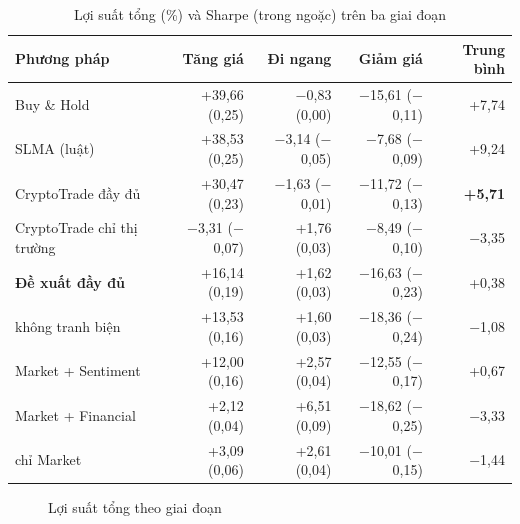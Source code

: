 \begin{table}[H]
\centering
\caption{Lợi suất tổng (\%) và Sharpe (trong ngoặc) trên ba giai đoạn}
\label{tab:main}
\small
\begin{tabular}{lrrrr}
\toprule
Phương pháp & Tăng giá & Đi ngang & Giảm giá & Trung bình \\
\midrule
Buy \& Hold & +39,66 (0,25) & $-$0,83 (0,00) & $-$15,61 ($-$0,11) & +7,74 \\
SLMA (luật) & +38,53 (0,25) & $-$3,14 ($-$0,05) & $-$7,68 ($-$0,09) & +9,24 \\
\midrule
CryptoTrade đầy đủ & +30,47 (0,23) & $-$1,63 ($-$0,01) & $-$11,72 ($-$0,13) & \textbf{+5,71} \\
CryptoTrade chỉ thị trường & $-$3,31 ($-$0,07) & +1,76 (0,03) & $-$8,49 ($-$0,10) & $-$3,35 \\
\midrule
\textbf{Đề xuất đầy đủ} & +16,14 (0,19) & +1,62 (0,03) & $-$16,63 ($-$0,23) & +0,38 \\
\quad không tranh biện & +13,53 (0,16) & +1,60 (0,03) & $-$18,36 ($-$0,24) & $-$1,08 \\
\quad Market + Sentiment & +12,00 (0,16) & +2,57 (0,04) & $-$12,55 ($-$0,17) & +0,67 \\
\quad Market + Financial & +2,12 (0,04) & +6,51 (0,09) & $-$18,62 ($-$0,25) & $-$3,33 \\
\quad chỉ Market & +3,09 (0,06) & +2,61 (0,04) & $-$10,01 ($-$0,15) & $-$1,44 \\
\bottomrule
\end{tabular}
\end{table}

\begin{figure}[H]
\centering
{}
\caption{Lợi suất tổng theo giai đoạn}
\label{fig:returns}
\end{figure}

